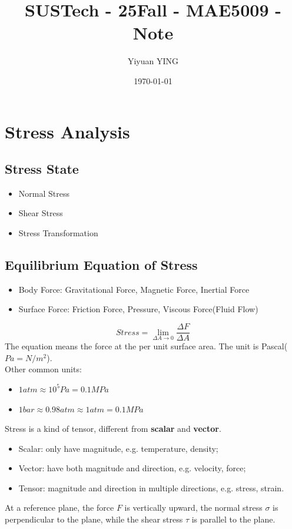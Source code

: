 \documentclass[en,hazy,cyan,8pt,normal]{elegantnote}
\title{SUSTech - 25Fall - MAE5009 - Note}
\author{Yiyuan YING}
\institute{Southern University of Science and Technology}
\date{\today}
\begin{document}
\maketitle

\section{Stress Analysis}
  \subsection{Stress State}
    \begin{itemize}
      \item Normal Stress
      \item Shear Stress
      \item Stress Transformation
    \end{itemize}

  \subsection{Equilibrium Equation of Stress}
    \begin{itemize}
      \item Body Force: Gravitational Force, Magnetic Force, Inertial Force
      \item Surface Force: Friction Force, Pressure, Viscous Force(Fluid Flow)
    \end{itemize}
    \begin{equation}\label{eq:001}
      Stress=\lim_{\Delta A \to 0} \frac{\Delta F}{\Delta A}
    \end{equation}
    The equation means the force at the per unit surface area. The unit is Pascal($Pa=N/m^2$).\\
    Other common units:
    \begin{itemize}
      \item $1 atm \approx 10^5 Pa = 0.1 MPa$
      \item $1 bar \approx 0.98 atm \approx 1 atm = 0.1 MPa$
    \end{itemize}
    Stress is a kind of tensor, different from \textbf{scalar} and \textbf{vector}.
    \begin{itemize}
      \item Scalar: only have magnitude, e.g. temperature, density;
      \item Vector: have both magnitude and direction, e.g. velocity, force;
      \item Tensor: magnitude and direction in multiple directions, e.g. stress, strain.
    \end{itemize}
    At a reference plane, the force $F$ is vertically upward, the normal stress $\sigma$ is perpendicular to the plane, while the shear stress $\tau$ is parallel to the plane.\\
\end{document}
